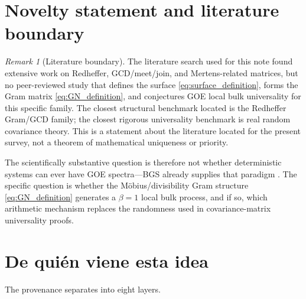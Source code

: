 \documentclass[11pt]{amsart}
\numberwithin{equation}{section}
\theoremstyle{plain}
\theoremstyle{definition}
\theoremstyle{remark}
\newtheorem{remark}[theorem]{Remark}
\begin{document}
\section{Novelty statement and literature boundary}
\label{sec:novelty_boundary}

\begin{remark}[Literature boundary]
\label{rem:literature_boundary}
The literature search used for this note found extensive work on Redheffer, GCD/meet/join, and Mertens-related matrices, but no peer-reviewed study that defines the surface \eqref{eq:surface_definition}, forms the Gram matrix \eqref{eq:GN_definition}, and conjectures GOE local bulk universality for this specific family.  The closest structural benchmark located is the Redheffer Gram/GCD family; the closest rigorous universality benchmark is real random covariance theory.  This is a statement about the literature located for the present survey, not a theorem of mathematical uniqueness or priority.
\end{remark}

The scientifically substantive question is therefore not whether deterministic systems can ever have GOE spectra---BGS already supplies that paradigm \cite{BGS1984}.  The specific question is whether the M\"obius/divisibility Gram structure \eqref{eq:GN_definition} generates a $\beta=1$ local bulk process, and if so, which arithmetic mechanism replaces the randomness used in covariance-matrix universality proofs.

\section{De qui\'en viene esta idea}
\label{sec:provenance}

The provenance separates into eight layers.
\end{document}
